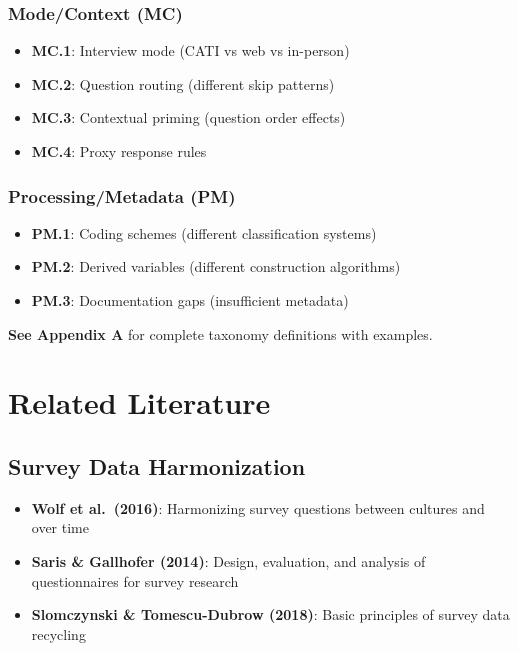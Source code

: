 \documentclass[
  letterpaper,
]{report}
\providecommand{\tightlist}{%
  \setlength{\itemsep}{0pt}\setlength{\parskip}{0pt}}
\begin{document}
\subsubsection{Mode/Context (MC)}\label{modecontext-mc}

\begin{itemize}
\tightlist
\item
  \textbf{MC.1}: Interview mode (CATI vs web vs in-person)
\item
  \textbf{MC.2}: Question routing (different skip patterns)
\item
  \textbf{MC.3}: Contextual priming (question order effects)
\item
  \textbf{MC.4}: Proxy response rules
\end{itemize}

\subsubsection{Processing/Metadata (PM)}\label{processingmetadata-pm}

\begin{itemize}
\tightlist
\item
  \textbf{PM.1}: Coding schemes (different classification systems)
\item
  \textbf{PM.2}: Derived variables (different construction algorithms)
\item
  \textbf{PM.3}: Documentation gaps (insufficient metadata)
\end{itemize}

\textbf{See Appendix A} for complete taxonomy definitions with examples.

\section{Related Literature}\label{related-literature}

\subsection{Survey Data Harmonization}\label{survey-data-harmonization}

\begin{itemize}
\tightlist
\item
  \textbf{Wolf et al.~(2016)}: Harmonizing survey questions between
  cultures and over time
\item
  \textbf{Saris \& Gallhofer (2014)}: Design, evaluation, and analysis
  of questionnaires for survey research
\item
  \textbf{Slomczynski \& Tomescu-Dubrow (2018)}: Basic principles of
  survey data recycling
\end{itemize}
\end{document}
